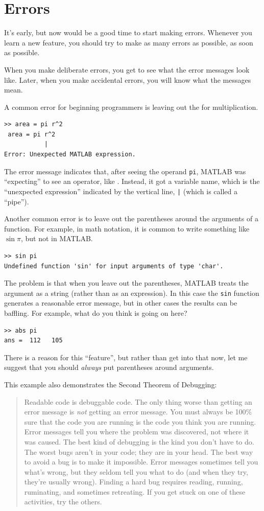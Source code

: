 \documentclass{book}
\newcommand{\displaythrm}[1]{%
    \ifthenelse{\equal{#1}{1}}%
        {Readable code is debuggable code.}{%
    \ifthenelse{\equal{#1}{2}}%
        {The only thing worse than getting an error message is {\em
         not} getting an error message.}{%
    \ifthenelse{\equal{#1}{3}}%
        {You must always be 100\% sure that the code you are running
         is the code you think you are running.}{%
    \ifthenelse{\equal{#1}{4}}%
        {Error messages tell you where the problem was discovered,
         not where it was caused.}{%
    \ifthenelse{\equal{#1}{5}}%
        {The best kind of debugging is the kind you don't have to do.}{%
    \ifthenelse{\equal{#1}{6}}%
        {The worst bugs aren't in your code; they are in your head.}{%
    \ifthenelse{\equal{#1}{7}}%
        {The best way to avoid a bug is to make it impossible.}{%
    \ifthenelse{\equal{#1}{8}}%
        {Error messages sometimes tell you what's wrong, but they
         seldom tell you what to do (and when they try, they're usually
         wrong).}{%
    \ifthenelse{\equal{#1}{9}}%
        {Finding a hard bug requires reading, running, ruminating,
         and sometimes retreating.  If you get stuck on one of these
         activities, try the others.}{%
    {}%
}}}}}}}}}}%
\begin{document}
\section{Errors}

It's early, but now would be a good time to start making errors.
Whenever you learn a new feature, you should try
to make as many errors as possible, as soon as possible.

When you make deliberate errors, you get to see what the error messages
look like.  Later, when you make accidental errors, you will know what
the messages mean.

A common error for beginning programmers is leaving out the {\tt *}
for multiplication.

\begin{verbatim}
>> area = pi r^2
 area = pi r^2
           |
Error: Unexpected MATLAB expression.
\end{verbatim}

The error message indicates that, after seeing the operand {\tt pi},
MATLAB was ``expecting'' to see an operator, like {\tt *}.  Instead,
it got a variable name, which is the ``unexpected expression'' indicated
by the vertical line, {\tt |} (which is called a ``pipe'').

Another common error is to leave out the parentheses around the
arguments of a function.  For example, in math notation, it is common
to write something like $\sin \pi$, but not in MATLAB.

\begin{verbatim}
>> sin pi
Undefined function 'sin' for input arguments of type 'char'.
\end{verbatim}

The problem is that when you leave out the parentheses, MATLAB treats
the argument as a string (rather than as an expression).  In
this case the {\tt sin} function generates a reasonable error message,
but in other cases the results can be baffling.  For example, what
do you think is going on here?

\begin{verbatim}
>> abs pi
ans =  112   105
\end{verbatim}

There is a reason for this ``feature'', but rather than get into that
now, let me suggest that you should {\em always} put parentheses around
arguments.

This example also demonstrates the Second Theorem of Debugging:

\begin{quote}
\displaythrm{2}
\end{quote}
\end{document}

